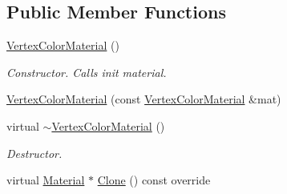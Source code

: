 \subsection*{Public Member Functions}
\begin{DoxyCompactItemize}
\item 
\mbox{\label{class_geometry_engine_1_1_geometry_material_1_1_vertex_color_material_ac187a64f7611b1c835180e48573a44f3}} 
\mbox{\hyperlink{class_geometry_engine_1_1_geometry_material_1_1_vertex_color_material_ac187a64f7611b1c835180e48573a44f3}{Vertex\+Color\+Material}} ()
\begin{DoxyCompactList}\small\item\em Constructor. Calls init material. \end{DoxyCompactList}\item 
\mbox{\hyperlink{class_geometry_engine_1_1_geometry_material_1_1_vertex_color_material_a34c914dc6b12a60e92116b5810d438a4}{Vertex\+Color\+Material}} (const \mbox{\hyperlink{class_geometry_engine_1_1_geometry_material_1_1_vertex_color_material}{Vertex\+Color\+Material}} \&mat)
\item 
\mbox{\label{class_geometry_engine_1_1_geometry_material_1_1_vertex_color_material_aa34ff05271ac73009e44ecc3100e5f40}} 
virtual \mbox{\hyperlink{class_geometry_engine_1_1_geometry_material_1_1_vertex_color_material_aa34ff05271ac73009e44ecc3100e5f40}{$\sim$\+Vertex\+Color\+Material}} ()
\begin{DoxyCompactList}\small\item\em Destructor. \end{DoxyCompactList}\item 
virtual \mbox{\hyperlink{class_geometry_engine_1_1_geometry_material_1_1_material}{Material}} $\ast$ \mbox{\hyperlink{class_geometry_engine_1_1_geometry_material_1_1_vertex_color_material_aecf808e45985f2a39662937fc18a21d0}{Clone}} () const override
\end{DoxyCompactItemize}
